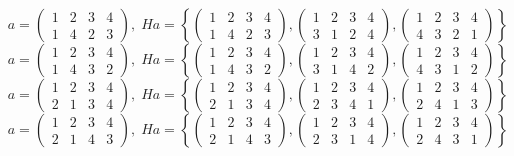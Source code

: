 \documentclass[a4paper,12pt]{article}
\begin{document}
\begin{itemize}
\[a = \begin{pmatrix} 1 & 2 & 3 & 4 \\ 1&4&2&3\end{pmatrix}, \; Ha = \left\{\begin{pmatrix} 1 & 2 & 3 & 4 \\ 1&4&2&3\end{pmatrix}, \begin{pmatrix} 1 & 2 & 3 & 4 \\ 3&1&2&4\end{pmatrix}, \begin{pmatrix} 1 & 2 & 3 & 4 \\ 4&3&2&1\end{pmatrix} \right\}\]
\[a = \begin{pmatrix} 1 & 2 & 3 & 4 \\ 1&4&3&2\end{pmatrix}, \; Ha = \left\{\begin{pmatrix} 1 & 2 & 3 & 4 \\ 1&4&3&2\end{pmatrix}, \begin{pmatrix} 1 & 2 & 3 & 4 \\ 3&1&4&2\end{pmatrix}, \begin{pmatrix} 1 & 2 & 3 & 4 \\ 4&3&1&2\end{pmatrix} \right\}\]
\[a = \begin{pmatrix} 1 & 2 & 3 & 4 \\ 2&1&3&4\end{pmatrix}, \; Ha = \left\{\begin{pmatrix} 1 & 2 & 3 & 4 \\ 2&1&3&4\end{pmatrix}, \begin{pmatrix} 1 & 2 & 3 & 4 \\ 2&3&4&1\end{pmatrix}, \begin{pmatrix} 1 & 2 & 3 & 4 \\ 2&4&1&3\end{pmatrix} \right\}\]
\[a = \begin{pmatrix} 1 & 2 & 3 & 4 \\ 2&1&4&3\end{pmatrix}, \; Ha = \left\{\begin{pmatrix} 1 & 2 & 3 & 4 \\ 2&1&4&3\end{pmatrix}, \begin{pmatrix} 1 & 2 & 3 & 4 \\ 2&3&1&4\end{pmatrix}, \begin{pmatrix} 1 & 2 & 3 & 4 \\ 2&4&3&1\end{pmatrix} \right\}\]

\end{itemize}
\end{document}
